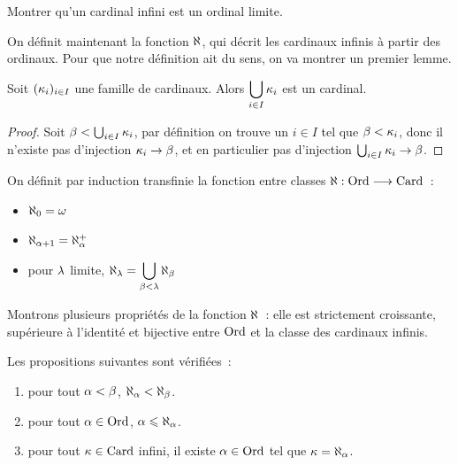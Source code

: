 \begin{exercise}
  Montrer qu'un cardinal infini est un ordinal limite.
\end{exercise}

On définit maintenant la fonction $\Cal$, qui décrit les cardinaux infinis à
partir des ordinaux. Pour que notre définition ait du sens, on va montrer un
premier lemme.

\begin{lemma}
  Soit $(\kappa_i)_{i\in I}$ une famille de cardinaux. Alors
  $\displaystyle\bigcup_{i\in I} \kappa_i$ est un cardinal.
\end{lemma}

\begin{proof}
  Soit $\beta < \bigcup_{i\in I}\kappa_i$, par définition on trouve un
  $i \in I$ tel que $\beta < \kappa_i$, donc il n'existe pas d'injection
  $\kappa_i \to \beta$, et en particulier pas d'injection
  $\bigcup_{i\in I}\kappa_i\to\beta$.
\end{proof}

\begin{definition}
  On définit par induction transfinie la fonction entre classes
  $\aleph : \displaystyle \operatorname{Ord} \longrightarrow \operatorname{Card}$~:
  \begin{itemize}
  \item $\aleph_0 = \omega$
  \item $\aleph_{\alpha + 1} = \aleph_\alpha^{+}$
  \item pour $\lambda$ limite,
    $\displaystyle\aleph_\lambda = \bigcup_{\beta < \lambda}\aleph_\beta$
  \end{itemize}
  \index[notation]{$\Cal$}
\end{definition}

Montrons plusieurs propriétés de la fonction $\Cal$~: elle est strictement
croissante, supérieure à l'identité et bijective entre $\operatorname{Ord}$ et la classe des
cardinaux infinis.

\begin{property}
  Les propositions suivantes sont vérifiées~:
  \begin{enumerate}[label=(\roman*)]
  \item pour tout $\alpha < \beta$, $\aleph_\alpha < \aleph_\beta$.
  \item pour tout $\alpha \in \operatorname{Ord}$, $\alpha \leqslant \aleph_\alpha$.
  \item pour tout $\kappa \in \operatorname{Card}$ infini, il existe $\alpha \in \operatorname{Ord}$ tel
    que $\kappa = \aleph_\alpha$.
  \end{enumerate}
\end{property}

